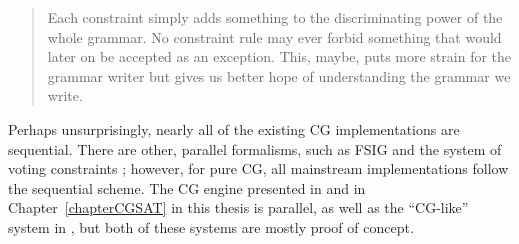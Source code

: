  \begin{quote}
 Each constraint simply adds something to the discriminating power of the
 whole grammar. No constraint rule may ever forbid something that would
 later on be accepted as an exception. This, maybe, puts more strain for
 the grammar writer but gives us better hope of understanding the grammar
 we write.
 \end{quote}

Perhaps unsurprisingly, nearly all of the existing CG implementations are sequential.
There are other, parallel formalisms, such as FSIG \cite{koskenniemi90} and the system of voting constraints \cite{oflazer97votingconstraints}; however, for pure CG, all mainstream implementations follow the sequential scheme.
The CG engine presented in \cite{listenmaa_claessen2015} and in Chapter~\ref{chapterCGSAT} in this thesis is parallel, as well as the ``CG-like'' system in \cite{lager98}, but both of these systems are mostly proof of concept.







% 
% 
% 
% 
% 

